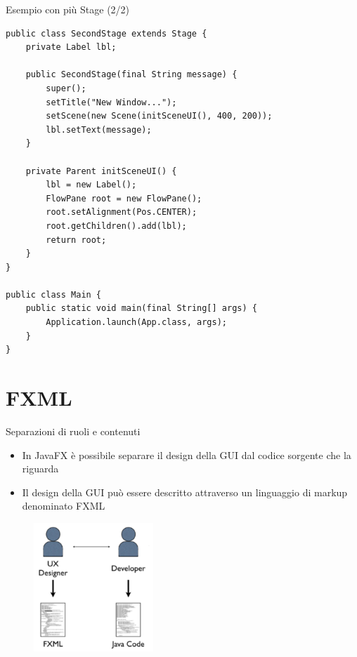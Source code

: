 \documentclass[xcolor=dvipsnames,presentation]{beamer}
\begin{document}
\begin{frame}[fragile]{Esempio con più Stage (2/2)}
\begin{lstlisting}[basicstyle=\tiny]
public class SecondStage extends Stage {
    private Label lbl;

    public SecondStage(final String message) {
        super();
	    setTitle("New Window...");
	    setScene(new Scene(initSceneUI(), 400, 200));
	    lbl.setText(message);
    }

    private Parent initSceneUI() {
        lbl = new Label();
	    FlowPane root = new FlowPane();
	    root.setAlignment(Pos.CENTER);
	    root.getChildren().add(lbl);
	    return root;
    }
}

public class Main {
    public static void main(final String[] args) {
        Application.launch(App.class, args); 
    }
}
\end{lstlisting}
\end{frame}




\section{FXML}

\begin{frame}{Separazioni di ruoli e contenuti}
\begin{itemize}\itemsep10pt
\item In JavaFX è possibile separare il design della GUI dal codice sorgente che la riguarda
\item Il design della GUI può essere descritto attraverso un linguaggio di markup denominato FXML
\end{itemize}
\begin{figure}
\includegraphics[width=0.4\textwidth]{img/soc.png}
\end{figure}
\end{frame}
\end{document}

